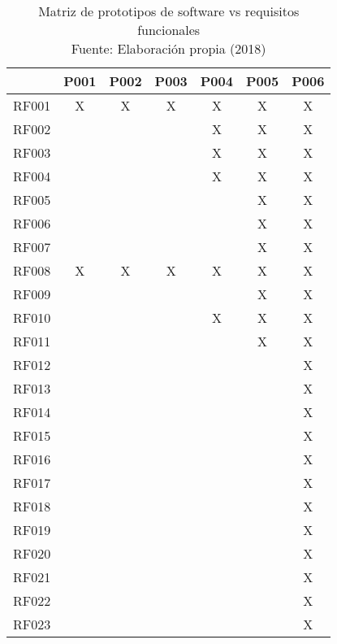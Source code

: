 \begin{table}[H]
\centering
\captionsetup{justification=centering}
\caption[Matriz de prototipos de software vs requisitos funcionales]{Matriz de prototipos de software vs requisitos funcionales \\ Fuente: Elaboración propia (2018)}
\label{table:RF-summary}
\begin{tabular}{|c|c|c|c|c|c|c|}
\hline
 & P001 & P002 & P003 & P004 & P005 & P006 \\ \hline
RF001 & X & X & X & X & X & X \\ \hline
RF002 &  &  &  & X & X & X \\ \hline
RF003 &  &  &  & X & X & X \\ \hline
RF004 &  &  &  & X & X & X \\ \hline
RF005 &  &  &  &  & X & X \\ \hline
RF006 &  &  &  &  & X & X \\ \hline
RF007 &  &  &  &  & X & X \\ \hline
RF008 & X & X & X & X & X & X \\ \hline
RF009 &  &  &  &  & X & X \\ \hline
RF010 &  &  &  & X & X & X \\ \hline
RF011 &  &  &  &  & X & X \\ \hline
RF012 &  &  &  &  &  & X \\ \hline
RF013 &  &  &  &  &  & X \\ \hline
RF014 &  &  &  &  &  & X \\ \hline
RF015 &  &  &  &  &  & X \\ \hline
RF016 &  &  &  &  &  & X \\ \hline
RF017 &  &  &  &  &  & X \\ \hline
RF018 &  &  &  &  &  & X \\ \hline
RF019 &  &  &  &  &  & X \\ \hline
RF020 &  &  &  &  &  & X \\ \hline
RF021 &  &  &  &  &  & X \\ \hline
RF022 &  &  &  &  &  & X \\ \hline
RF023 &  &  &  &  &  & X \\ \hline
\end{tabular}
\end{table}



